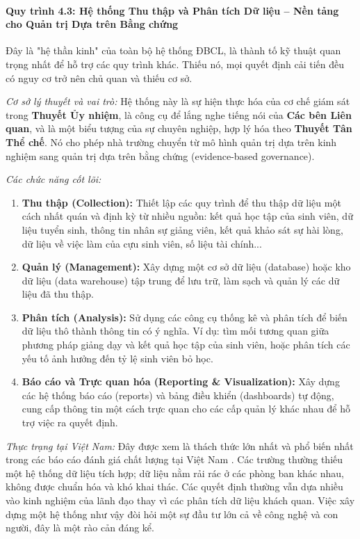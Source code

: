 \documentclass[12pt, a4paper, openany]{report}
\begin{document}
\paragraph{Quy trình 4.3: Hệ thống Thu thập và Phân tích Dữ liệu – Nền tảng cho Quản trị Dựa trên Bằng chứng}

Đây là "hệ thần kinh" của toàn bộ hệ thống ĐBCL, là thành tố kỹ thuật quan trọng nhất để hỗ trợ các quy trình khác. Thiếu nó, mọi quyết định cải tiến đều có nguy cơ trở nên chủ quan và thiếu cơ sở.

\textit{Cơ sở lý thuyết và vai trò:} Hệ thống này là sự hiện thực hóa của cơ chế giám sát trong \textbf{Thuyết Ủy nhiệm}, là công cụ để lắng nghe tiếng nói của \textbf{Các bên Liên quan}, và là một biểu tượng của sự chuyên nghiệp, hợp lý hóa theo \textbf{Thuyết Tân Thể chế}. Nó cho phép nhà trường chuyển từ mô hình quản trị dựa trên kinh nghiệm sang quản trị dựa trên bằng chứng (evidence-based governance).

\textit{Các chức năng cốt lõi:}
\begin{enumerate}
    \item \textbf{Thu thập (Collection):} Thiết lập các quy trình để thu thập dữ liệu một cách nhất quán và định kỳ từ nhiều nguồn: kết quả học tập của sinh viên, dữ liệu tuyển sinh, thông tin nhân sự giảng viên, kết quả khảo sát sự hài lòng, dữ liệu về việc làm của cựu sinh viên, số liệu tài chính...
    \item \textbf{Quản lý (Management):} Xây dựng một cơ sở dữ liệu (database) hoặc kho dữ liệu (data warehouse) tập trung để lưu trữ, làm sạch và quản lý các dữ liệu đã thu thập.
    \item \textbf{Phân tích (Analysis):} Sử dụng các công cụ thống kê và phân tích để biến dữ liệu thô thành thông tin có ý nghĩa. Ví dụ: tìm mối tương quan giữa phương pháp giảng dạy và kết quả học tập của sinh viên, hoặc phân tích các yếu tố ảnh hưởng đến tỷ lệ sinh viên bỏ học.
    \item \textbf{Báo cáo và Trực quan hóa (Reporting \& Visualization):} Xây dựng các hệ thống báo cáo (reports) và bảng điều khiển (dashboards) tự động, cung cấp thông tin một cách trực quan cho các cấp quản lý khác nhau để hỗ trợ việc ra quyết định.
\end{enumerate}

\textit{Thực trạng tại Việt Nam:} Đây được xem là thách thức lớn nhất và phổ biến nhất trong các báo cáo đánh giá chất lượng tại Việt Nam \cite{CommonFailureCriteria, AUN-QA_Challenges_VN}. Các trường thường thiếu một hệ thống dữ liệu tích hợp; dữ liệu nằm rải rác ở các phòng ban khác nhau, không được chuẩn hóa và khó khai thác. Các quyết định thường vẫn dựa nhiều vào kinh nghiệm của lãnh đạo thay vì các phân tích dữ liệu khách quan. Việc xây dựng một hệ thống như vậy đòi hỏi một sự đầu tư lớn cả về công nghệ và con người, đây là một rào cản đáng kể.
\end{document}
